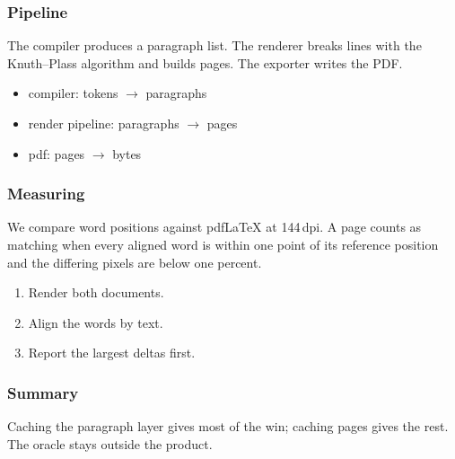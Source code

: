 \documentclass{beamer}
\begin{document}
\begin{frame}
  \frametitle{Pipeline}
  The compiler produces a paragraph list. The renderer breaks lines with the
  Knuth--Plass algorithm and builds pages. The exporter writes the PDF.

  \begin{itemize}
    \item compiler: tokens $\to$ paragraphs
    \item render pipeline: paragraphs $\to$ pages
    \item pdf: pages $\to$ bytes
  \end{itemize}
\end{frame}

\begin{frame}
  \frametitle{Measuring}
  We compare word positions against pdfLaTeX at 144\,dpi. A page counts as
  matching when every aligned word is within one point of its reference
  position and the differing pixels are below one percent.

  \begin{enumerate}
    \item Render both documents.
    \item Align the words by text.
    \item Report the largest deltas first.
  \end{enumerate}
\end{frame}

\begin{frame}
  \frametitle{Summary}
  Caching the paragraph layer gives most of the win; caching pages gives the
  rest. The oracle stays outside the product.
\end{frame}
\end{document}
